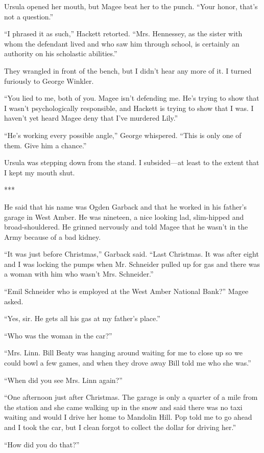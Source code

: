 {Ursula opened her mouth, but Magee beat her to the punch. “Your honor, that’s not a question.”

“I phrased it as such,” Hackett retorted. “Mrs. Hennessey, as the sister with whom the defendant lived and who saw him through school, is certainly an authority on his scholastic abilities.”

They wrangled in front of the bench, but I didn’t hear any more of it. I turned furiously to George Winkler.

“You lied to me, both of you. Magee isn’t defending me. He’s trying to show that I wasn’t psychologically responsible, and Hackett is trying to show that I was. I haven’t yet heard Magee deny that I’ve murdered Lily.”

“He’s working every possible angle,” George whispered. “This is only one of them. Give him a chance.”

Ursula was stepping down from the stand. I subsided—at least to the extent that I kept my mouth shut.

***

He said that his name was Ogden Garback and that he worked in his father’s garage in West Amber. He was nineteen, a nice looking lad, slim-hipped and broad-shouldered. He grinned nervously and told Magee that he wasn’t in the Army because of a bad kidney.

“It was just before Christmas,” Garback said. “Last Christmas. It was after eight and I was locking the pumps when Mr. Schneider pulled up for gas and there was a woman with him who wasn’t Mrs. Schneider.”

“Emil Schneider who is employed at the West Amber National Bank?” Magee asked.

“Yes, sir. He gets all his gas at my father’s place.”

“Who was the woman in the car?”

“Mrs. Linn. Bill Beaty was hanging around waiting for me to close up so we could bowl a few games, and when they drove away Bill told me who she was.”

“When did you see Mrs. Linn again?”

“One afternoon just after Christmas. The garage is only a quarter of a mile from the station and she came walking up in the snow and said there was no taxi waiting and would I drive her home to Mandolin Hill. Pop told me to go ahead and I took the car, but I clean forgot to collect the dollar for driving her.”

“How did you do that?”

}
